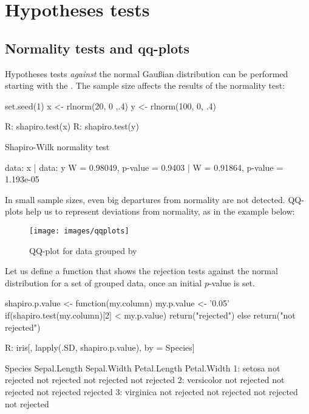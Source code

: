 \section{Hypotheses tests}\label{sec: tests}
\subsection{Normality tests and qq-plots}
Hypotheses tests \emph{against} the normal 
Gau\ss ian distribution can be performed 
starting with the .
The sample size affects
the results of the normality test:
\begin{example}
set.seed(1)
x <- rlnorm(20, 0 ,.4)
y <- rlnorm(100, 0, .4)

R: shapiro.test(x)
R: shapiro.test(y)

	        Shapiro-Wilk normality test

data:  x                      | data: y
W = 0.98049, p-value = 0.9403 | W = 0.91864, p-value = 1.193e-05
\end{example}
In small sample sizes, even big departures from
normality are not detected. QQ-plots help us to
represent deviations from normality, as in the
example below:
\begin{figure}[htbp]
 \centering
 \texttt{[image: images/qqplots]}
 \caption*{QQ-plot for data grouped by}
\end{figure}
Let us define a function that shows the rejection tests 
against the normal distribution for a set of 
grouped data, once an initial $p$-value is set.
\begin{example}
shapiro.p.value <- function(my.column) {
    my.p.value <- '0.05'
    if(shapiro.test(my.column)[2] < my.p.value){
        return("rejected")
    } else {
        return("not rejected")
    }
} 
 
R: iris[, lapply(.SD, shapiro.p.value), by = Species]

      Species Sepal.Length  Sepal.Width Petal.Length  Petal.Width
1:     setosa not rejected not rejected not rejected not rejected
2: versicolor not rejected not rejected not rejected     rejected
3:  virginica not rejected not rejected not rejected not rejected
\end{example}

